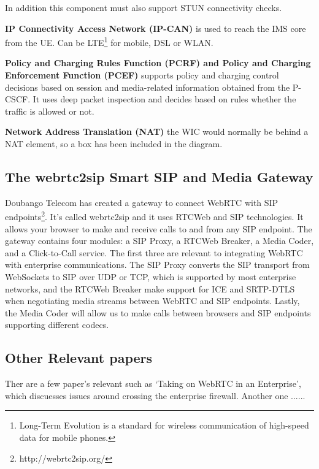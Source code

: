 In addition this component must also support STUN connectivity checks.

\textbf{IP Connectivity Access Network (IP-CAN)}
is used to reach the IMS core from the UE. Can be LTE\footnote{Long-Term Evolution is a standard for wireless communication of high-speed data for mobile phones.} for mobile, DSL or WLAN.

\textbf{Policy and Charging Rules Function (PCRF) and Policy and Charging Enforcement Function (PCEF)}
supports policy and charging control decisions based on session and media-related information obtained from the P-CSCF. It uses deep packet inspection and decides based on rules whether the traffic is allowed or not.

\textbf{Network Address Translation (NAT)}
the WIC would normally be behind a NAT element, so a box has been included in the diagram.

\subsection{The webrtc2sip Smart SIP and Media Gateway}
\label{sec:webrtc2sip}
Doubango Telecom has created a gateway to connect WebRTC with SIP endpoints\footnote{http://webrtc2sip.org/}. It's called webrtc2sip and it uses RTCWeb and SIP technologies. It allows your browser to make and receive calls to and from any SIP endpoint. The gateway contains four modules: a SIP Proxy, a RTCWeb Breaker, a Media Coder, and a Click-to-Call service. The first three are relevant to integrating WebRTC with enterprise communications. The SIP Proxy converts the SIP transport from WebSockets to SIP over UDP or TCP, which is supported by most enterprise networks, and the RTCWeb Breaker make support for ICE and SRTP-DTLS when negotiating media streams between WebRTC and SIP endpoints. Lastly, the Media Coder will allow us to make calls between browsers and SIP endpoints supporting different codecs.


\subsection{Other Relevant papers}
Ther are a few paper's relevant such as `Taking on WebRTC in an Enterprise\cite{johnston_taking_2013}', which discuesses issues around crossing the enterprise firewall. Another one ......